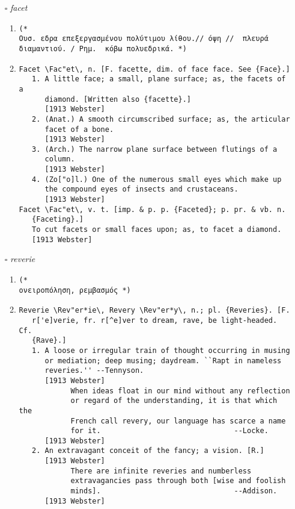 \documentclass{article}
\begin{document}
\begin{itemize}
\item[$\square$] \emph{ facet }
\begin{enumerate}
\item{
\begin{lstlisting}
(* 
Ουσ. εδρα επεξεργασμένου πολύτιμου λίθου.// όψη //  πλευρά διαμαντιού. / Ρημ.  κόβω πολυεδρικά. *)
\end{lstlisting}}
\item{
\begin{lstlisting}
Facet \Fac"et\, n. [F. facette, dim. of face face. See {Face}.]
   1. A little face; a small, plane surface; as, the facets of a
      diamond. [Written also {facette}.]
      [1913 Webster]
   2. (Anat.) A smooth circumscribed surface; as, the articular
      facet of a bone.
      [1913 Webster]
   3. (Arch.) The narrow plane surface between flutings of a
      column.
      [1913 Webster]
   4. (Zo["o]l.) One of the numerous small eyes which make up
      the compound eyes of insects and crustaceans.
      [1913 Webster]
Facet \Fac"et\, v. t. [imp. & p. p. {Faceted}; p. pr. & vb. n.
   {Faceting}.]
   To cut facets or small faces upon; as, to facet a diamond.
   [1913 Webster]
\end{lstlisting}}
\end{enumerate}
\item[$\square$] \emph{ reverie }
\begin{enumerate}
\item{
\begin{lstlisting}
(* 
ονειροπόληση, ρεμβασμός *)
\end{lstlisting}}
\item{
\begin{lstlisting}
Reverie \Rev"er*ie\, Revery \Rev"er*y\, n.; pl. {Reveries}. [F.
   r['e]verie, fr. r[^e]ver to dream, rave, be light-headed. Cf.
   {Rave}.]
   1. A loose or irregular train of thought occurring in musing
      or mediation; deep musing; daydream. ``Rapt in nameless
      reveries.'' --Tennyson.
      [1913 Webster]
            When ideas float in our mind without any reflection
            or regard of the understanding, it is that which the
            French call revery, our language has scarce a name
            for it.                               --Locke.
      [1913 Webster]
   2. An extravagant conceit of the fancy; a vision. [R.]
      [1913 Webster]
            There are infinite reveries and numberless
            extravagancies pass through both [wise and foolish
            minds].                               --Addison.
      [1913 Webster]

\end{lstlisting}}
\end{enumerate}
\end{itemize}
\end{document}
